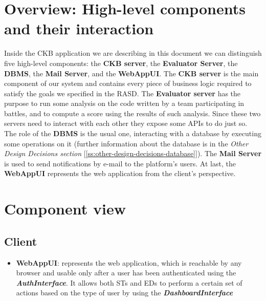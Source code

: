\section{Overview: High-level components and their interaction}
\label{s:overview}%
Inside the CKB application we are describing in this document we can distinguish five high-level components: the \textbf{CKB server}, the \textbf{Evaluator Server}, the \textbf{DBMS}, the \textbf{Mail Server}, and the \textbf{WebAppUI}.
The \textbf{CKB server} is the main component of our system and contains every piece of business logic required to satisfy the goals we specified in the RASD.
The \textbf{Evaluator server} has the purpose to run some analysis on the code written by a team participating in battles, and to compute a score using the results of such analysis.
Since these two servers need to interact with each other they expose some APIs to do just so. 
The role of the \textbf{DBMS} is the usual one, interacting with a database by executing some operations on it (further information about the database is in the \textit{Other Design Decisions section} [\ref{ss:other-design-decisions-database}]).
The \textbf{Mail Server} is used to send notifications by e-mail to the platform’s users. At last, the \textbf{WebAppUI} represents the web application from the client's perspective.
\pagebreak
\section{Component view}
\label{s:component-view}%
\subsection*{Client}
\begin{itemize}
  \item \textbf{WebAppUI}: represents the web application, which is reachable by any browser and usable only after a user has been authenticated using the \textbf{\textit{AuthInterface}}. It allows both STs and EDs to perform a certain set of actions based on the type of user by using the \textbf{\textit{DashboardInterface}}
\end{itemize}
